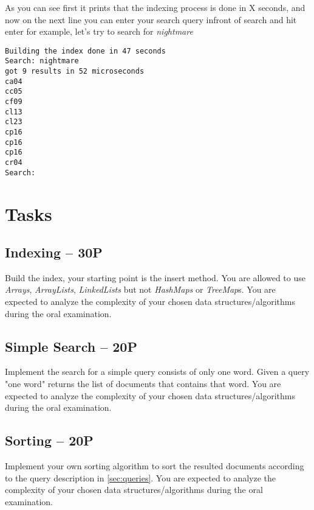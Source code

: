 \documentclass[11pt]{article}
\begin{document}
As you can see first it prints that the indexing process is done in X seconds, and now on the next line you can enter your search query infront of search and hit enter for example, let's try to search for \textit{nightmare}

\begin{verbatim}
Building the index done in 47 seconds
Search: nightmare
got 9 results in 52 microseconds
ca04
cc05
cf09
cl13
cl23
cp16
cp16
cp16
cr04
Search: 
\end{verbatim}
 
 
\section{Tasks}

\subsection{Indexing -- 30P} 
Build the index, your starting point is the insert method. You are allowed to use \textit{Arrays}, \textit{ArrayLists}, \textit{LinkedLists} but not \textit{HashMaps} or \textit{TreeMap}s. You are expected to analyze the complexity of your chosen data structures/algorithms during the oral examination.

\subsection{Simple Search -- 20P} 
Implement the search for a simple query consists of only one word. Given a query "one word" returns the list of documents that contains that word. You are expected to analyze the complexity of your chosen data structures/algorithms during the oral examination.

\subsection{Sorting -- 20P} 
Implement your own sorting algorithm to sort the resulted documents according to the query description in \ref{sec:queries}. You are expected to analyze the complexity of your chosen data structures/algorithms during the oral examination.
\end{document}
